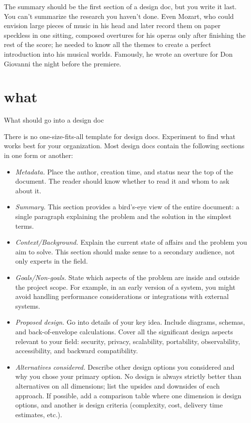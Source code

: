 \documentclass{article}
\begin{document}
The summary should be the first section of a design doc, but you write it last.
You can't summarize the research you haven't done.
Even Mozart, who could envision large pieces of music in his head and later record them on paper speckless in one sitting, composed overtures for his operas only after finishing the rest of the score; he needed to know all the themes to create a perfect introduction into his musical worlds.
Famously, he wrote an overture for Don Giovanni the night before the premiere.

\section{what}{What should go into a design doc}

There is no one-size-fits-all template for design docs.
Experiment to find what works best for your organization.
Most design docs contain the following sections in one form or another:
\begin{itemize}
\item \emph{Metadata.}
  Place the author, creation time, and status near the top of the document.
  The reader should know whether to read it and whom to ask about it.
\item \emph{Summary.}
  This section provides a bird's-eye view of the entire document: a single paragraph explaining the problem and the solution in the simplest terms.
\item \emph{Context/Background.}
  Explain the current state of affairs and the problem you aim to solve.
  This section should make sense to a secondary audience, not only experts in the field.
\item \emph{Goals/Non-goals.}
  State which aspects of the problem are inside and outside the project scope.
  For example, in an early version of a system, you might avoid handling performance considerations or integrations with external systems.
\item \emph{Proposed design.}
  Go into details of your key idea.
  Include diagrams, schemas, and back-of-envelope calculations.
  Cover all the significant design aspects relevant to your field: security, privacy, scalability, portability, observability, accessibility, and backward compatibility.
\item \emph{Alternatives considered.}
  Describe other design options you considered and why you chose your primary option.
  No design is always strictly better than alternatives on all dimensions; list the upsides and downsides of each approach.
  If possible, add a comparison table where one dimension is design options, and another is design criteria (complexity, cost, delivery time estimates, etc.).
\end{itemize}
\end{document}
